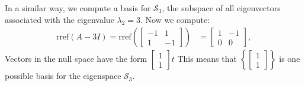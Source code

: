 \documentclass{ximera}
\begin{document}
\begin{example}
\begin{explanation}
In a similar way, we compute a basis for $\mathcal{S}_3$, the subspace of all eigenvectors associated with the eigenvalue $\lambda_2=3$.  Now we compute:
\begin{align*}\mbox{rref}(A-3I)=\mbox{rref}\left(\begin{bmatrix}-1&1\\1&-1\end{bmatrix}\right)&=\begin{bmatrix}1&-1\\0&0\end{bmatrix},
\end{align*}
Vectors in the null space have the form $\begin{bmatrix}1\\1\end{bmatrix}t$ This means that $\left\{\begin{bmatrix}1\\1\end{bmatrix}\right\}$ is one possible basis for the eigenspace $\mathcal{S}_3$.
\end{explanation}
\end{example}
\end{document}
